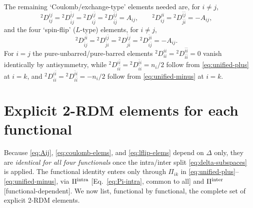 \documentclass[11pt,a4paper]{article}
\newcommand{\Dtwo}{{}^2D}
\newcommand{\PiMat}{\Pi}
\newcommand{\DeltaMat}{\Delta}
\begin{document}
The remaining `Coulomb/exchange-type' elements needed are, for
$i\neq j$,
\begin{equation}
\Dtwo^{ij}_{ij}=\Dtwo^{\bar ij}_{\bar ij}=\Dtwo^{i\bar j}_{i\bar j}
=\Dtwo^{\bar i\bar j}_{\bar i\bar j}=A_{ij},
\qquad
\Dtwo^{ji}_{ij}=\Dtwo^{\bar i\bar j}_{\bar j\bar i}=-A_{ij},
\label{eq:coulomb-elems}
\end{equation}
and the four `spin-flip' ($L$-type) elements, for $i\neq j$,
\begin{equation}
\Dtwo^{j\bar i}_{\bar ij}=\Dtwo^{i\bar j}_{\bar ji}
=\Dtwo^{\bar ij}_{j\bar i}=\Dtwo^{\bar ji}_{i\bar j}=-A_{ij}.
\label{eq:lflip-elems}
\end{equation}
For $i=j$ the pure-unbarred/pure-barred elements
$\Dtwo^{ii}_{ii}=\Dtwo^{\bar i\bar i}_{\bar i\bar i}=0$ vanish
identically by antisymmetry, while $\Dtwo^{i\bar i}_{i\bar i}=\Dtwo^{\bar ii}_{\bar ii}=n_i/2$
follow from \eqref{eq:unified-plus} at $i=k$, and
$\Dtwo^{i\bar i}_{\bar ii}=\Dtwo^{\bar ii}_{i\bar i}=-n_i/2$ follow
from \eqref{eq:unified-minus} at $i=k$.

\section{Explicit 2-RDM elements for each functional}
\label{sec:functionals}

Because \eqref{eq:Aij}, \eqref{eq:coulomb-elems}, and
\eqref{eq:lflip-elems} depend on $\DeltaMat$ only, they are
\emph{identical for all four functionals} once the intra/inter split
\eqref{eq:delta-subspaces} is applied. The functional identity enters
only through $\PiMat_{ik}$ in \eqref{eq:unified-plus}--\eqref{eq:unified-minus},
via $\PiMat^{\rm intra}$ [Eq.~\eqref{eq:Pi-intra}, common to all] and
$\PiMat^{\rm inter}$ [functional-dependent]. We now list, functional
by functional, the complete set of explicit 2-RDM elements.
\end{document}
